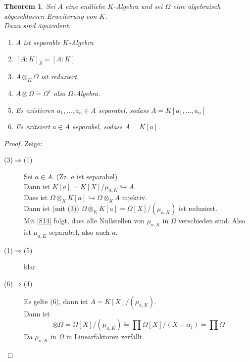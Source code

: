 \documentclass[10pt,a4paper]{article}
\newcommand{\al}{\ensuremath{\alpha}}
\newcommand{\isomorph}{\ensuremath{\tilde{=}}}
\newcounter{thm}[section]
\theoremstyle{definition}
\theoremstyle{plain}
\newtheorem{theorem}[thm]{Theorem}
\theoremstyle{remark}
\begin{document}
\begin{theorem}\label{926thm}
	Sei $A$ eine endliche $K$-Algebra und sei $\Omega$ eine algebraisch abgeschlossen Erweiterung von $K$.\\
	Dann sind äquivalent:
	\begin{enumerate}
		\item $A$ ist separable $K$-Algebra
		\item $[A:K]_S=[A:K]$
		\item $A\otimes_K\Omega$ ist reduziert.
		\item $A\otimes\Omega\isomorph \Omega^r$ also $\Omega$-Algebra.
		\item Es existieren $a_1,...,a_n\in A$ separabel, sodass $A=K[a_1,...,a_n]$
		\item Es exitsiert $a\in A$ separabel, sodass $A=K[a]$.
	\end{enumerate}
\end{theorem}
\begin{proof}
	Zeige:\\
	\begin{description}
		\item[(3)$\Rightarrow$(1)] Sei $a\in A$. (Zz. $a$ ist separabel)\\
		Dann ist $K[a]=K[X]/\mu_{a,K}\hookrightarrow A$.\\
		Dass ist $\Omega\otimes_K K[a]\hookrightarrow \Omega\otimes_K A$ injektiv.\\
		Dann ist (mit (3)) $\Omega\otimes_K K[a]=\Omega[X]/(\mu_{a,K})$ ist reduziert.\\
		Mit \ref{814} folgt, dass alle Nullstellen von $\mu_{a,K}$ in $\Omega$ verschieden sind. Also ist $\mu_{a,K}$ separabel, also auch $a$.
		\item[(1)$\Rightarrow$(5)] klar
		\item[(6)$\Rightarrow$(4)] Es gelte (6), dann ist $A=K[X]/(\mu_{a,K})$.\\
		Dann ist 
		\[\otimes\Omega=\Omega[X]/(\mu_{a,K})\isomorph\prod \Omega[X]/(X-\al_i)=\prod\Omega\]
		Da $\mu_{a,K}$ in $\Omega$ in Linearfaktoren zerfällt.
	\end{description}
\end{proof}
\end{document}
